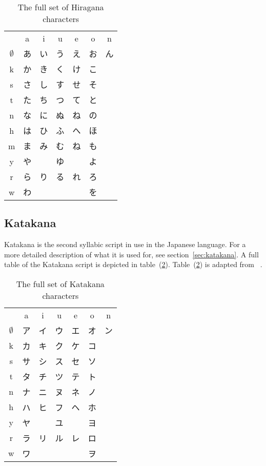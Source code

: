 \begin{table}[htbp]
\begin{CJK}
\begin{center}
  \begin{tabular}{c c c c c c c}
 &a&i&u&e&o&n\\
$\emptyset$&あ&い&う&え&お&ん\\
k&か&き&く&け&こ&\\
s&さ&し&す&せ&そ&\\
t&た&ち&つ&て&と&\\
n&な&に&ぬ&ね&の&\\
h&は&ひ&ふ&へ&ほ&\\
m&ま&み&む&ね&も&\\
y&や& &ゆ& &よ&\\
r&ら&り&る&れ&ろ&\\
w&わ& & & &を&\\
  \end{tabular}
\end{center}
\end{CJK}
\caption{The full set of Hiragana characters}
\label{table:fullhiragana}
\end{table}

\subsection{Katakana }
\label{sec:app:katakana}

Katakana is the second syllabic script in use in the Japanese language. 
For a more detailed description of what it is used for, see 
section~\ref{sec:katakana}.
A full table of the Katakana script is depicted in 
table~(\ref{table:fullkatakana}).
Table~(\ref{table:fullkatakana}) is adapted from ~\citeyear{Hadamitzky1995}.

\begin{table}[htbp]
\begin{CJK}
\begin{center}
  \begin{tabular}{c c c c c c c}
 &a&i&u&e&o&n\\
$\emptyset$&ア&イ&ウ&エ&オ&ン\\
k&カ&キ&ク&ケ&コ&\\
s&サ&シ&ス&セ&ソ&\\
t&タ&チ&ツ&テ&ト&\\
n&ナ&ニ&ヌ&ネ&ノ&\\
h&ハ&ヒ&フ&ヘ&ホ&\\
y&ヤ&　&ユ&　&ヨ&\\
r&ラ&リ&ル&レ&ロ&\\
w&ワ&　&　&　&ヲ&\\
  \end{tabular}
\end{center}
\end{CJK}
\caption{The full set of Katakana characters}
\label{table:fullkatakana}
\end{table}


